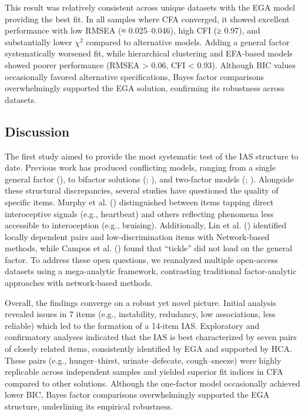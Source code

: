 \documentclass[
  jou,
  floatsintext,
  longtable,
  nolmodern,
  notxfonts,
  notimes,
  colorlinks=true,linkcolor=blue,citecolor=blue,urlcolor=blue]{apa7}
\begin{document}
This result was relatively consistent across unique datasets with the
EGA model providing the best fit. In all samples where CFA converged, it
showed excellent performance with low RMSEA (≈ 0.025--0.046), high CFI
(≥ 0.97), and substantially lower \(\chi^2\) compared to alternative
models. Adding a general factor systematically worsened fit, while
hierarchical clustering and EFA-based models showed poorer performance
(RMSEA \textgreater{} 0.06, CFI \textless{} 0.93). Although BIC values
occasionally favored alternative specifications, Bayes factor
comparisons overwhelmingly supported the EGA solution, confirming its
robustness across datasets.

\subsection{Discussion}\label{discussion}

The first study aimed to provide the most systematic test of the IAS
structure to date. Previous work has produced conflicting models,
ranging from a single general factor (), to bifactor solutions (; ), and two-factor
models (;
). Alongside these
structural discrepancies, several studies have questioned the quality of
specific items. Murphy et al. ()
distinguished between items tapping direct interoceptive signals (e.g.,
heartbeat) and others reflecting phenomena less accessible to
interoception (e.g., bruising). Additionally, Lin et al.
() identified locally dependent pairs and
low-discrimination items with Network-based methods, while Campos et al.
() found that ``tickle'' did not load on
the general factor. To address these open questions, we reanalyzed
multiple open-access datasets using a mega-analytic framework,
contrasting traditional factor-analytic approaches with network-based
methods.

Overall, the findings converge on a robust yet novel picture. Initial
analysis revealed issues in 7 items (e.g., instability, redudancy, low
associations, less reliable) which led to the formation of a 14-item
IAS. Exploratory and confirmatory analyses indicated that the IAS is
best characterized by seven pairs of closely related items, consistently
identified by EGA and supported by HCA. These pairs (e.g.,
hunger--thirst, urinate--defecate, cough--sneeze) were highly replicable
across independent samples and yielded superior fit indices in CFA
compared to other solutions. Although the one-factor model occasionally
achieved lower BIC, Bayes factor comparisons overwhelmingly supported
the EGA structure, underlining its empirical robustness.
\end{document}
